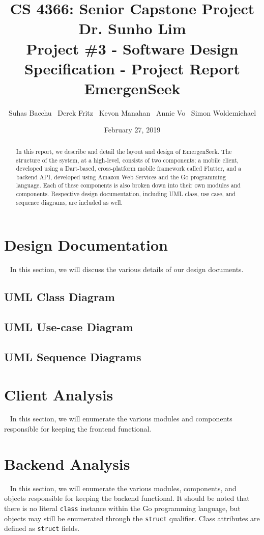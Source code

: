 \documentclass[10pt, a4paper]{article}
\title{\large CS 4366: Senior Capstone Project \\ Dr. Sunho Lim \\ Project \#3 - Software Design Specification - Project Report \\ EmergenSeek}
\author{Suhas Bacchu \ Derek Fritz \ Kevon Manahan \ Annie Vo \ Simon Woldemichael}
\date{February 27, 2019}
\begin{document}
\maketitle
\vspace{-1cm}
\begin{abstract}
In this report, we describe and detail the layout and design of EmergenSeek. The structure of the system, at a high-level, consists of two components; a mobile client, developed using a Dart-based, cross-platform mobile framework called Flutter, and a backend API, developed using Amazon Web Services and the Go programming language. Each of these components is also broken down into their own modules and components. Respective design documentation, including UML class, use case, and sequence diagrams, are included as well.
\end{abstract}

\section{Design Documentation}
\par ~ In this section, we will discuss the various details of our design documents.

\subsection{UML Class Diagram}
\subsection{UML Use-case Diagram}
\subsection{UML Sequence Diagrams}

\section{Client Analysis}
\par ~ In this section, we will enumerate the various modules and components responsible for keeping the frontend functional.

\section{Backend Analysis}
\par ~ In this section, we will enumerate the various modules, components, and objects responsible for keeping the backend functional. It should be noted that there is no literal \texttt{class} instance within the Go programming language, but objects may still be enumerated through the \texttt{struct} qualifier. Class attributes are defined as \texttt{struct} fields.
\end{document}
